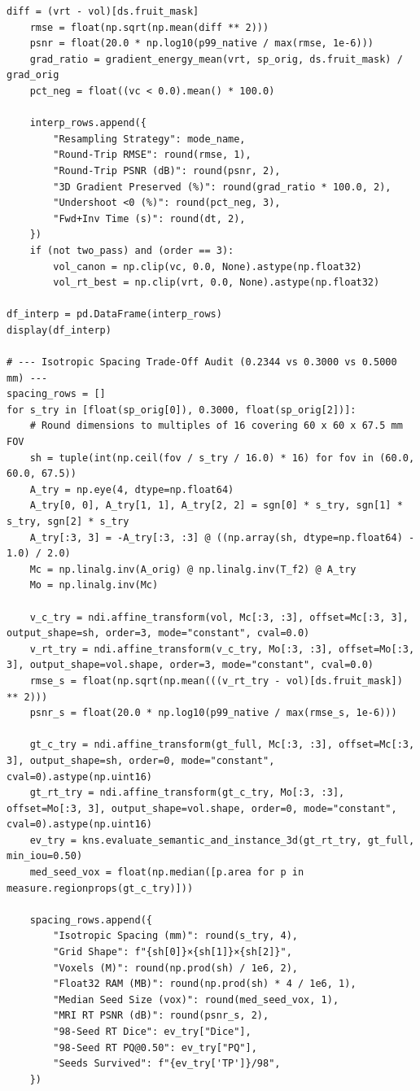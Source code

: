 \documentclass[10pt,a4paper]{article}
\renewcommand{\_}{\origunderscore\allowbreak}
\begin{document}
\begin{codebox}
\begin{lstlisting}[style=pybmed]
    diff = (vrt - vol)[ds.fruit_mask]
    rmse = float(np.sqrt(np.mean(diff ** 2)))
    psnr = float(20.0 * np.log10(p99_native / max(rmse, 1e-6)))
    grad_ratio = gradient_energy_mean(vrt, sp_orig, ds.fruit_mask) / grad_orig
    pct_neg = float((vc < 0.0).mean() * 100.0)

    interp_rows.append({
        "Resampling Strategy": mode_name,
        "Round-Trip RMSE": round(rmse, 1),
        "Round-Trip PSNR (dB)": round(psnr, 2),
        "3D Gradient Preserved (%)": round(grad_ratio * 100.0, 2),
        "Undershoot <0 (%)": round(pct_neg, 3),
        "Fwd+Inv Time (s)": round(dt, 2),
    })
    if (not two_pass) and (order == 3):
        vol_canon = np.clip(vc, 0.0, None).astype(np.float32)
        vol_rt_best = np.clip(vrt, 0.0, None).astype(np.float32)

df_interp = pd.DataFrame(interp_rows)
display(df_interp)

# --- Isotropic Spacing Trade-Off Audit (0.2344 vs 0.3000 vs 0.5000 mm) ---
spacing_rows = []
for s_try in [float(sp_orig[0]), 0.3000, float(sp_orig[2])]:
    # Round dimensions to multiples of 16 covering 60 x 60 x 67.5 mm FOV
    sh = tuple(int(np.ceil(fov / s_try / 16.0) * 16) for fov in (60.0, 60.0, 67.5))
    A_try = np.eye(4, dtype=np.float64)
    A_try[0, 0], A_try[1, 1], A_try[2, 2] = sgn[0] * s_try, sgn[1] * s_try, sgn[2] * s_try
    A_try[:3, 3] = -A_try[:3, :3] @ ((np.array(sh, dtype=np.float64) - 1.0) / 2.0)
    Mc = np.linalg.inv(A_orig) @ np.linalg.inv(T_f2) @ A_try
    Mo = np.linalg.inv(Mc)

    v_c_try = ndi.affine_transform(vol, Mc[:3, :3], offset=Mc[:3, 3], output_shape=sh, order=3, mode="constant", cval=0.0)
    v_rt_try = ndi.affine_transform(v_c_try, Mo[:3, :3], offset=Mo[:3, 3], output_shape=vol.shape, order=3, mode="constant", cval=0.0)
    rmse_s = float(np.sqrt(np.mean(((v_rt_try - vol)[ds.fruit_mask]) ** 2)))
    psnr_s = float(20.0 * np.log10(p99_native / max(rmse_s, 1e-6)))

    gt_c_try = ndi.affine_transform(gt_full, Mc[:3, :3], offset=Mc[:3, 3], output_shape=sh, order=0, mode="constant", cval=0).astype(np.uint16)
    gt_rt_try = ndi.affine_transform(gt_c_try, Mo[:3, :3], offset=Mo[:3, 3], output_shape=vol.shape, order=0, mode="constant", cval=0).astype(np.uint16)
    ev_try = kns.evaluate_semantic_and_instance_3d(gt_rt_try, gt_full, min_iou=0.50)
    med_seed_vox = float(np.median([p.area for p in measure.regionprops(gt_c_try)]))

    spacing_rows.append({
        "Isotropic Spacing (mm)": round(s_try, 4),
        "Grid Shape": f"{sh[0]}×{sh[1]}×{sh[2]}",
        "Voxels (M)": round(np.prod(sh) / 1e6, 2),
        "Float32 RAM (MB)": round(np.prod(sh) * 4 / 1e6, 1),
        "Median Seed Size (vox)": round(med_seed_vox, 1),
        "MRI RT PSNR (dB)": round(psnr_s, 2),
        "98-Seed RT Dice": ev_try["Dice"],
        "98-Seed RT PQ@0.50": ev_try["PQ"],
        "Seeds Survived": f"{ev_try['TP']}/98",
    })


\end{lstlisting}
\end{codebox}
\end{document}
